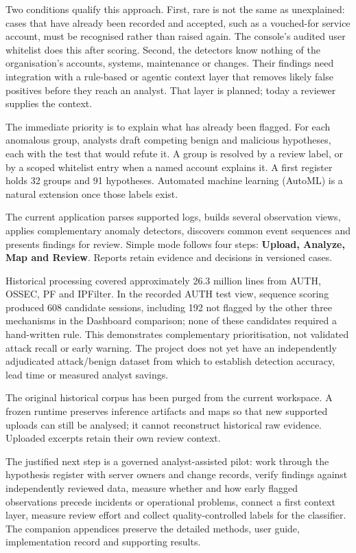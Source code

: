 \documentclass[11pt,a4paper]{article}
\begin{document}
Two conditions qualify this approach. First, rare is not the same as unexplained: cases that have already been recorded and accepted, such as a vouched-for service account, must be recognised rather than raised again. The console's audited user whitelist does this after scoring. Second, the detectors know nothing of the organisation's accounts, systems, maintenance or changes. Their findings need integration with a rule-based or agentic context layer that removes likely false positives before they reach an analyst. That layer is planned; today a reviewer supplies the context.

The immediate priority is to explain what has already been flagged. For each anomalous group, analysts draft competing benign and malicious hypotheses, each with the test that would refute it. A group is resolved by a review label, or by a scoped whitelist entry when a named account explains it. A first register holds 32 groups and 91 hypotheses. Automated machine learning (AutoML) is a natural extension once those labels exist.

The current application parses supported logs, builds several observation views, applies complementary anomaly detectors, discovers common event sequences and presents findings for review. Simple mode follows four steps: \textbf{Upload, Analyze, Map and Review}. Reports retain evidence and decisions in versioned cases.

Historical processing covered approximately 26.3 million lines from AUTH, OSSEC, PF and IPFilter. In the recorded AUTH test view, sequence scoring produced 608 candidate sessions, including 192 not flagged by the other three mechanisms in the Dashboard comparison; none of these candidates required a hand-written rule. This demonstrates complementary prioritisation, not validated attack recall or early warning. The project does not yet have an independently adjudicated attack/benign dataset from which to establish detection accuracy, lead time or measured analyst savings.

The original historical corpus has been purged from the current workspace. A frozen runtime preserves inference artifacts and maps so that new supported uploads can still be analysed; it cannot reconstruct historical raw evidence. Uploaded excerpts retain their own review context.

The justified next step is a governed analyst-assisted pilot: work through the hypothesis register with server owners and change records, verify findings against independently reviewed data, measure whether and how early flagged observations precede incidents or operational problems, connect a first context layer, measure review effort and collect quality-controlled labels for the classifier. The companion appendices preserve the detailed methods, user guide, implementation record and supporting results.
\end{document}
